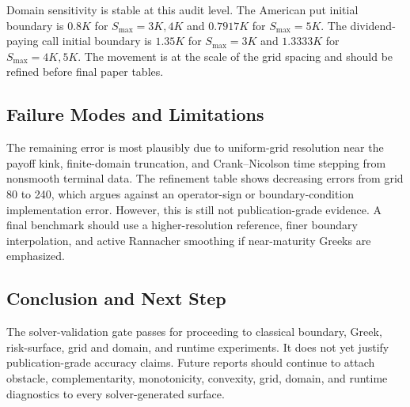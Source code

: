 \documentclass[11pt]{article}
\begin{document}
\begin{table}[h]
\centering
{}
\caption{Obstacle, complementarity, shape, and PSOR diagnostics on the smoke grid. These discrete checks assess feasibility and residual consistency; they do not replace the separate grid and domain audits.}
\end{table}

Domain sensitivity is stable at this audit level. The American put initial boundary is $0.8K$ for $S_{\max}=3K,4K$ and $0.7917K$ for $S_{\max}=5K$. The dividend-paying call initial boundary is $1.35K$ for $S_{\max}=3K$ and $1.3333K$ for $S_{\max}=4K,5K$. The movement is at the scale of the grid spacing and should be refined before final paper tables.



\subsection{Failure Modes and Limitations}
The remaining error is most plausibly due to uniform-grid resolution near the payoff kink, finite-domain truncation, and Crank--Nicolson time stepping from nonsmooth terminal data. The refinement table shows decreasing errors from grid 80 to 240, which argues against an operator-sign or boundary-condition implementation error. However, this is still not publication-grade evidence. A final benchmark should use a higher-resolution reference, finer boundary interpolation, and active Rannacher smoothing if near-maturity Greeks are emphasized.

\subsection{Conclusion and Next Step}
The solver-validation gate passes for proceeding to classical boundary, Greek,
risk-surface, grid and domain, and runtime experiments. It does not yet justify
publication-grade accuracy claims. Future reports should continue to attach
obstacle, complementarity, monotonicity, convexity, grid, domain, and runtime
diagnostics to every solver-generated surface.
\end{document}
